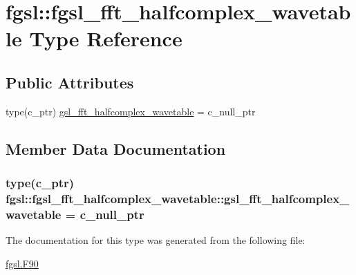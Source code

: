 \hypertarget{structfgsl_1_1fgsl__fft__halfcomplex__wavetable}{\section{fgsl\-:\-:fgsl\-\_\-fft\-\_\-halfcomplex\-\_\-wavetable Type Reference}
\label{structfgsl_1_1fgsl__fft__halfcomplex__wavetable}
}
\subsection*{Public Attributes}
\begin{DoxyCompactItemize}
\item 
type(c\-\_\-ptr) \hyperlink{structfgsl_1_1fgsl__fft__halfcomplex__wavetable_add900077adc0ba713682ec60b81d3c5a}{gsl\-\_\-fft\-\_\-halfcomplex\-\_\-wavetable} = c\-\_\-null\-\_\-ptr
\end{DoxyCompactItemize}


\subsection{Member Data Documentation}
\hypertarget{structfgsl_1_1fgsl__fft__halfcomplex__wavetable_add900077adc0ba713682ec60b81d3c5a}{
\subsubsection[{gsl\-\_\-fft\-\_\-halfcomplex\-\_\-wavetable}]{\setlength{\rightskip}{0pt plus 5cm}type(c\-\_\-ptr) fgsl\-::fgsl\-\_\-fft\-\_\-halfcomplex\-\_\-wavetable\-::gsl\-\_\-fft\-\_\-halfcomplex\-\_\-wavetable = c\-\_\-null\-\_\-ptr}}\label{structfgsl_1_1fgsl__fft__halfcomplex__wavetable_add900077adc0ba713682ec60b81d3c5a}


The documentation for this type was generated from the following file\-:\begin{DoxyCompactItemize}
\item 
\hyperlink{fgsl_8F90}{fgsl.\-F90}\end{DoxyCompactItemize}
